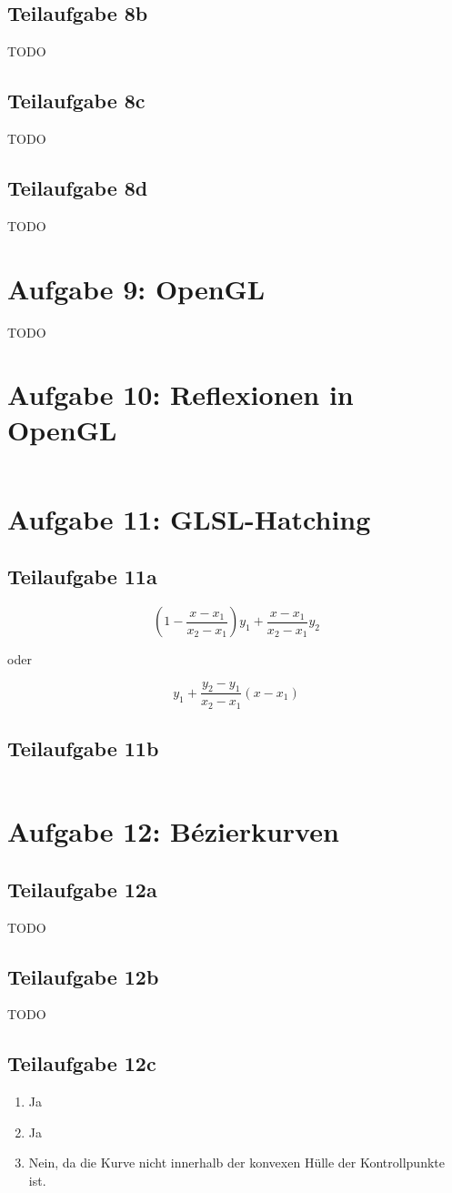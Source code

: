 \documentclass[a4paper]{scrartcl}
\begin{document}
\subsection*{Teilaufgabe 8b}
TODO
\subsection*{Teilaufgabe 8c}
TODO
\subsection*{Teilaufgabe 8d}
TODO

\section*{Aufgabe 9: OpenGL}
TODO

\section*{Aufgabe 10: Reflexionen in OpenGL}
\inputminted[linenos, numbersep=5pt, tabsize=4, frame=lines, label=shader.frag]{glsl}{shader.frag}

\section*{Aufgabe 11: GLSL-Hatching}
\subsection*{Teilaufgabe 11a}

\[
	\left(1 - \frac{x - x_1}{x_2 - x_1}\right) y_1 + \frac{x - x_1}{x_2 - x_1} y_2
\]

oder

\[
	y_1 + \frac{y_2 - y_1}{x_2 - x_1} (x - x_1)
\]

\subsection*{Teilaufgabe 11b}
\inputminted[linenos, numbersep=5pt, tabsize=4, frame=lines, label=shader.frag]{glsl}{hatching.frag}

\section*{Aufgabe 12: Bézierkurven}
\subsection*{Teilaufgabe 12a}
TODO
\subsection*{Teilaufgabe 12b}
TODO
\subsection*{Teilaufgabe 12c}
\begin{enumerate}
    \item Ja
    \item Ja
    \item Nein, da die Kurve nicht innerhalb der konvexen Hülle der
          Kontrollpunkte ist.
\end{enumerate}
\end{document}

